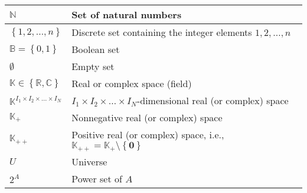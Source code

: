 \begin{xltabular}{\textwidth}{XX}
	\(\mathbb{N}\)                                             & Set of natural numbers                                                                                                                             \\ \hline
	\(\left\{ 1,2, \dots, n \right\}\)                         & Discrete set containing the integer elements \(1,2, \dots, n\)                                                                                     \\ \hline
	\(\mathbb{B} = \left\{ 0, 1 \right\}\)                     & Boolean set                                                                                                                                        \\ \hline %
	\(\emptyset\)                                              & Empty set                                                                                                                                          \\ \hline
	\(\mathbb{K} \in \left\{ \mathbb{R}, \mathbb{C} \right\}\) & Real or complex space (field)                                                                                                                      \\ \hline
	\(\mathbb{K}^{I_1\times I_2 \times \dots \times I_N}\)     & \(I_1\times I_2 \times \dots \times I_N\)-dimensional real (or complex) space                                                                      \\ \hline
	\(\mathbb{K}_{+}\)                                         & Nonnegative real (or complex) space \cite{boydConvexOptimization2004}                                                                              \\ \hline
	\(\mathbb{K}_{++}\)                                        & Positive real (or complex) space, i.e., \(\mathbb{K}_{++} = \mathbb{K}_{+}\setminus\left\{ \mathbf{0} \right\}\) \cite{boydConvexOptimization2004} \\ \hline
	\(U\)                                                      & Universe                                                                                                                                           \\ \hline
	\(2^A\)                                                    & Power set of \(A\)                                                                                                                                 \\ \hline
\end{xltabular}

